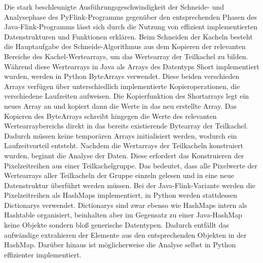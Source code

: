 Die stark beschleunigte Ausführungsgeschwindigkeit der Schneide- und Analysephase des PyFlink-Programms gegenüber den entsprechenden Phasen des Java-Flink-Programms lässt sich durch die Nutzung von effizient implementierten Datenstrukturen und Funktionen erklären. Beim Schneiden der Kacheln besteht die Hauptaufgabe des Schneide-Algorithmus aus dem Kopieren der relevanten Bereiche des Kachel-Wertearrays, um das Wertearray der Teilkachel zu bilden. Während diese Wertearrays in Java als Arrays des Datentyps Short implementiert wurden, werden in Python ByteArrays verwendet. Diese beiden verschieden Arrays verfügen über unterschiedlich implementierte Kopieroperationen, die verschiedene Laufzeiten aufweisen. Die Kopierfunktion des Shortarrays legt ein neues Array an und kopiert dann die Werte in das neu erstellte Array. Das Kopieren des ByteArrays schreibt hingegen die Werte des relevanten Wertearraybereichs direkt in das bereits existierende Bytearray der Teilkachel. Dadurch müssen keine temporären Arrays initialisiert werden, wodurch ein Laufzeitvorteil entsteht.
Nachdem die Wertarrays der Teilkacheln konstruiert wurden, beginnt die Analyse der Daten. Diese erfordert das Konstruieren der Pixelzeitreihen aus einer Teilkachelgruppe. Das bedeutet, dass alle Pixelwerte der Wertearrays aller Teilkacheln der Gruppe einzeln gelesen und in eine neue Datenstruktur überführt werden müssen. Bei der Java-Flink-Variante werden die Pixelzeitreihen als HashMaps implementiert, in Python werden stattdessen Dictionarys verwendet. Dictionarys sind zwar ebenso wie HashMaps intern als Hashtable organisiert, beinhalten aber im Gegensatz zu einer Java-HashMap keine Objekte sondern bloß generische Datentypen. Dadurch entfällt das aufwändige extrahieren der Elemente aus den entsprechenden Objekten in der HashMap. Darüber hinaus ist möglicherweise die Analyse selbst in Python effizienter implementiert.

